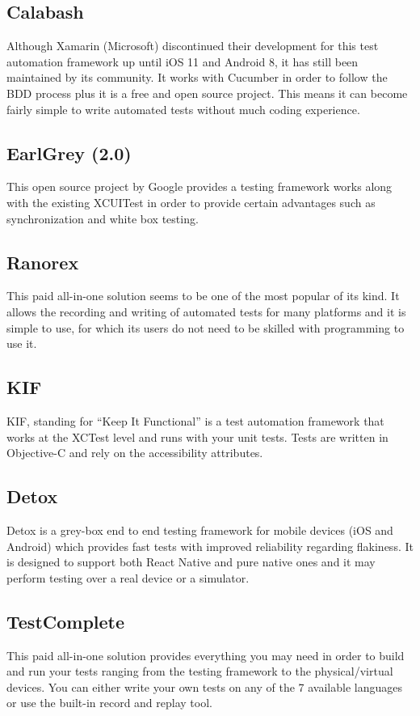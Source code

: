 \subsection {Calabash}
Although Xamarin (Microsoft) discontinued their development for this test automation framework up until iOS 11 and Android 8, it has still been maintained by its community. It works with Cucumber in order to follow the BDD process plus it is a free and open source project. This means it can become fairly simple to write automated tests without much coding experience. \cite{Calabash}

\subsection {EarlGrey (2.0)}
This open source project by Google provides a testing framework works along with the existing XCUITest in order to provide certain advantages such as synchronization and white box testing. \cite{EarlGrey}
	
\subsection {Ranorex}
This paid all-in-one solution seems to be one of the most popular of its kind. It allows the recording and writing of automated tests for many platforms and it is simple to use, for which its users do not need to be skilled with programming to use it. \cite{Ranorex}

\subsection {KIF}
KIF, standing for “Keep It Functional” is a test automation framework that works at the XCTest level and runs with your unit tests. Tests are written in Objective-C and rely on the accessibility attributes. \cite{KIF}

\subsection {Detox}
Detox is a grey-box end to end testing framework for mobile devices (iOS and Android) which provides fast tests with improved reliability regarding flakiness. It is designed to support both React Native and pure native ones and it may perform testing over a real device or a simulator. \cite{Detox}

\subsection {TestComplete}
This paid all-in-one solution provides everything you may need in order to build and run your tests ranging from the testing framework to the physical/virtual devices. You can either write your own tests on any of the 7 available languages or use the built-in record and replay tool. \cite{TestComplete}

